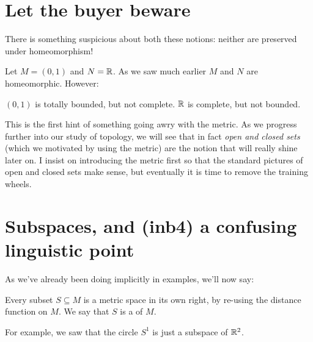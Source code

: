\section{Let the buyer beware}
There is something suspicious about both these notions:
neither are preserved under homeomorphism!

\begin{example}
	\label{ex:fishy}
	Let $M = (0,1)$ and $N = \mathbb R$.
	As we saw much earlier $M$ and $N$ are homeomorphic.
	However:
	\begin{itemize}
		\ii $(0,1)$ is totally bounded, but not complete.
		\ii $\mathbb R$ is complete, but not bounded.
	\end{itemize}
\end{example}

This is the first hint of something going awry with the metric.
As we progress further into our study of topology,
we will see that in fact \emph{open and closed sets}
(which we motivated by using the metric)
are the notion that will really shine later on.
I insist on introducing the metric first so that
the standard pictures of open and closed sets make sense,
but eventually it is time to remove the training wheels.



\section{Subspaces, and (inb4) a confusing linguistic point}

As we've already been doing implicitly in examples, we'll now say:
\begin{definition}
	Every subset $S \subseteq M$ is a metric space in its own right,
	by re-using the distance function on $M$.
	We say that $S$ is a  of $M$.
\end{definition}
For example, we saw that the circle $S^1$
is just a subspace of $\mathbb R^2$.

